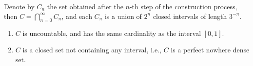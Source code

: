 \begin{property}
    Denote by \(C_n\) the set obtained after the \(n\)-th step of the construction process, 
    then \(C = \bigcap_{n=0}^{\infty} C_n\), and each \(C_n\) is a union of \(2^n\) closed intervals of length \(3^{-n}\).
    \begin{enumerate}
        \item \(C\) is uncountable, and has the same cardinality as the interval \([0, 1]\).
        \item \(C\) is a closed set not containing any interval, i.e., \(C\) is a perfect nowhere dense set.
    \end{enumerate}
\end{property}